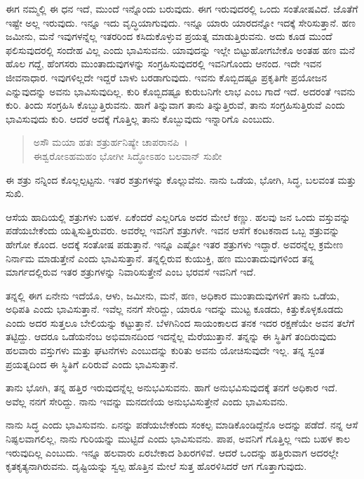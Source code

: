 ಈಗ ನಮ್ಮಲ್ಲಿ ಈ ಧನ ಇದೆ, ಮುಂದೆ ಇನ್ನೊಂದು ಬರುವುದು. ಈಗ ಇರುವುದರಲ್ಲಿ ಒಂದು ಸಂತೋಷವಿದೆ. ಜೊತೆಗೆ ಇಷ್ಟೇ ಅಲ್ಲ ಇರುವುದು. ಇನ್ನೂ ಇದು ವೃದ್ಧಿಯಾಗುವುದು. ಇನ್ನೂ ಯಾರು ಯಾರದನ್ನೋ ಇದಕ್ಕೆ ಸೇರಿಸುತ್ತಾನೆ. ಹಣ ಜಮೀನು, ಮನೆ ಇವುಗಳನ್ನೆಲ್ಲ ಇತರರಿಂದ ಕಸಿದುಕೊಳ್ಳುವ ಪ್ರಯತ್ನ ಮಾಡುತ್ತಿರುವನು. ಅದು ಕೂಡ ಮುಂದೆ ಫಲಿಸುವುದರಲ್ಲಿ ಸಂದೇಹ ವಿಲ್ಲ ಎಂದು ಭಾವಿಸುವನು. ಯಾವುದನ್ನು ಇಲ್ಲೇ ಬಿಟ್ಟುಹೋಗಬೇಕೊ ಅಂತಹ ಹಣ ಮನೆ ಹೊಲ ಗದ್ದೆ, ಹೆಂಗಸರು ಮುಂತಾದುವುಗಳನ್ನು ಸಂಗ್ರಹಿಸುವುದರಲ್ಲಿ ಇವನಿಗೊಂದು ಆನಂದ. ಇದೇ ಇವನ ಜೀವನಾಧಾರ. ಇವುಗಳಿಲ್ಲದೇ ಇದ್ದರೆ ಬಾಳು ಬರಡಾಗುವುದು. ಇವನು ಕೊಬ್ಬಿದಷ್ಟೂ ಪ್ರಕೃತಿಗೇ ಪ್ರಯೋಜನ ಎನ್ನುವುದನ್ನು ಅವನು ಭಾವಿಸುವುದಿಲ್ಲ. ಕುರಿ ಕೊಬ್ಬಿದಷ್ಟೂ ಕುರುಬನಿಗೇ ಲಾಭ ಎಂಬ ಗಾದೆ ಇದೆ. ಅದರಂತೆ ಇವನು ಕುರಿ. ತಿಂದು ಸಂಗ್ರಹಿಸಿ ಕೊಬ್ಬುತ್ತಿರುವನು. ಹಾಗೆ ತಿನ್ನುವಾಗ ತಾನು ತಿನ್ನುತ್ತಿರುವೆ, ತಾನು ಸಂಗ್ರಹಿಸುತ್ತಿರುವೆ ಎಂದು ಭಾವಿಸುವುದು ಕುರಿ. ಆದರೆ ಅದಕ್ಕೆ ಗೊತ್ತಿಲ್ಲ ತಾನು ಕೊಬ್ಬುವುದು ಇನ್ನಾರಿಗೊ ಎಂಬುದು.

\begin{verse}
ಅಸೌ ಮಯಾ ಹತಃ ಶತ್ರುರ್ಹನಿಷ್ಯೇ ಚಾಪರಾನಪಿ~।\\ಈಶ್ವರೋಽಹಮಹಂ ಭೋಗೀ ಸಿದ್ಧೋಽಹಂ ಬಲವಾನ್ ಸುಖೀ 
\end{verse}

{\small ಈ ಶತ್ರು ನನ್ನಿಂದ ಕೊಲ್ಲಲ್ಪಟ್ಟನು. ಇತರ ಶತ್ರುಗಳನ್ನು ಕೊಲ್ಲುವೆನು. ನಾನು ಒಡೆಯ, ಭೋಗಿ, ಸಿದ್ಧ, ಬಲವಂತ ಮತ್ತು ಸುಖಿ.}

ಆಸೆಯ ಹಾದಿಯಲ್ಲಿ ಶತ್ರುಗಳು ಬಹಳ. ಏಕೆಂದರೆ ಎಲ್ಲರಿಗೂ ಅದರ ಮೇಲೆ ಕಣ್ಣು. ಹಲವು ಜನ ಒಂದು ವಸ್ತುವನ್ನು ಪಡೆಯಬೇಕೆಂದು ಯತ್ನಿಸುತ್ತಿರುವರು. ಅವರೆಲ್ಲ ಇವನಿಗೆ ಶತ್ರುಗಳೇ. ಇವನ ಆಸೆಗೆ ಕಂಟಕನಾದ ಒಬ್ಬ ಶತ್ರುವನ್ನು ಹೇಗೋ ಕೊಂದ. ಅದಕ್ಕೆ ಸಂತೋಷ ಪಡುತ್ತಾನೆ. ಇನ್ನೂ ಎಷ್ಟೋ ಇತರ ಶತ್ರುಗಳು ಇದ್ದಾರೆ. ಅವರನ್ನೆಲ್ಲ ಕ್ರಮೇಣ ನಿರ್ನಾಮ ಮಾಡುತ್ತೇನೆ ಎಂದು ಭಾವಿಸುತ್ತಾನೆ. ತನ್ನಲ್ಲಿರುವ ಕುಯುಕ್ತಿ, ಹಣ ಮುಂತಾದುವುಗಳಿಂದ ತನ್ನ ಮಾರ್ಗದಲ್ಲಿರುವ ಇತರ ಶತ್ರುಗಳನ್ನು ನಿವಾರಿಸುತ್ತೇನೆ ಎಂಬ ಭರವಸೆ ಇವನಿಗೆ ಇದೆ.

ತನ್ನಲ್ಲಿ ಈಗ ಏನೇನು ಇದೆಯೊ, ಆಳು, ಜಮೀನು, ಮನೆ, ಹಣ, ಅಧಿಕಾರ ಮುಂತಾದುವುಗಳಿಗೆ ತಾನು ಒಡೆಯ, ಅಧಿಪತಿ ಎಂದು ಭಾವಿಸುತ್ತಾನೆ. ಇವೆಲ್ಲ ನನಗೆ ಸೇರಿದ್ದು, ಯಾರೂ ಇದನ್ನು ಮುಟ್ಟ ಕೂಡದು, ಕಿತ್ತುಕೊಳ್ಳಕೂಡದು ಎಂದು ಅದರ ಸುತ್ತಲೂ ಬೇಲಿಯನ್ನು ಕಟ್ಟುತ್ತಾನೆ. ಬೆಳಗಿನಿಂದ ಸಾಯಂಕಾಲದ ತನಕ ಇದರ ರಕ್ಷಣೆಯೇ ಅವನ ತಲೆಗೆ ತಟ್ಟಿದ್ದು. ಆದರೂ ಒಡೆಯನೆಂಬ ಅಭಿಮಾನದಿಂದ ಇದನ್ನೆಲ್ಲ ಮೆರೆಯುತ್ತಾನೆ. ತನ್ನನ್ನು ಈ ಸ್ಥಿತಿಗೆ ತಂದಿರುವುದು ಹಲವಾರು ವಸ್ತುಗಳು ಮತ್ತು ಘಟನೆಗಳು ಎಂಬುದನ್ನು ಕುರಿತು ಅವನು ಯೋಚಿಸುವುದೇ ಇಲ್ಲ. ತನ್ನ ಸ್ವಂತ ಪ್ರಯತ್ನದಿಂದ ಈ ಸ್ಥಿತಿಗೆ ಏರಿರುವೆ ಎಂದು ಭಾವಿಸುತ್ತಾನೆ.

ತಾನು ಭೋಗಿ, ತನ್ನ ಹತ್ತಿರ ಇರುವುದನ್ನೆಲ್ಲ ಅನುಭವಿಸುವನು. ಹಾಗೆ ಅನುಭವಿಸುವುದಕ್ಕೆ ತನಗೆ ಅಧಿಕಾರ ಇದೆ. ಅವೆಲ್ಲ ನನಗೆ ಸೇರಿದ್ದು. ನಾನು ಇವನ್ನು ಮನದಣಿಯ ಅನುಭವಿಸುತ್ತೇನೆ ಎಂದು ಭಾವಿಸುವನು.

ನಾನು ಸಿದ್ಧ ಎಂದು ಭಾವಿಸುವನು. ಏನನ್ನು ಪಡೆಯಬೇಕೆಂದು ಸಂಕಲ್ಪ ಮಾಡಿಕೊಂಡಿದ್ದೆನೊ ಅದನ್ನು ಪಡೆದೆ. ನನ್ನ ಆಸೆ ನಿಷ್ಫಲವಾಗಲಿಲ್ಲ, ನಾನು ಗುರಿಯನ್ನು ಮುಟ್ಟಿದೆ ಎಂದು ಭಾವಿಸುವನು. ಪಾಪ, ಅವನಿಗೆ ಗೊತ್ತಿಲ್ಲ ಇದು ಬಹಳ ಕಾಲ ಇರುವುದಿಲ್ಲ ಎಂಬುದು. ಇನ್ನೂ ಹಲವಾರು ಏರಬೇಕಾದ ಶಿಖರಗಳಿವೆ. ಆದರೆ ಒಂದನ್ನು ಹತ್ತಿರುವಾಗ ಅದರಲ್ಲೇ ಕೃತಕೃತ್ಯನಾಗಿರುವನು. ದೃಷ್ಟಿಯನ್ನು ಸ್ವಲ್ಪ ಹೊತ್ತಿನ ಮೇಲೆ ಸುತ್ತ ಹೊರಳಿಸಿದರೆ ಆಗ ಗೊತ್ತಾಗುವುದು.


